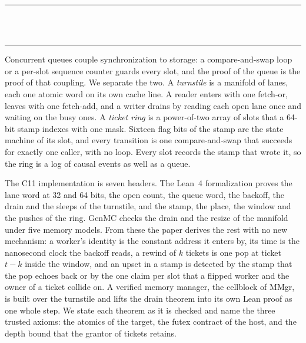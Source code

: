 \thispagestyle{empty}
\begin{center}
  \rule{\textwidth}{0.4pt}\\[0.9em]
  {\Large{}}\\[0.7em]
  \rule{\textwidth}{0.4pt}
\end{center}
\bigskip

\noindent Concurrent queues couple synchronization to storage: a compare-and-swap loop or a
per-slot sequence counter guards every slot, and the proof of the queue is the proof of that
coupling. We separate the two. A \emph{turnstile} is a manifold of lanes, each one atomic word on
its own cache line. A reader enters with one fetch-or, leaves with one fetch-add, and a writer
drains by reading each open lane once and waiting on the busy ones. A \emph{ticket ring} is a
power-of-two array of slots that a 64-bit stamp indexes with one mask. Sixteen flag bits of the
stamp are the state machine of its slot, and every transition is one compare-and-swap that
succeeds for exactly one caller, with no loop. Every slot records the stamp that wrote it, so the
ring is a log of causal events as well as a queue.

The C11 implementation is seven headers. The Lean~4 formalization proves the lane word at 32 and
64 bits, the open count, the queue word, the backoff, the drain and the sleeps of the turnstile, and
the stamp, the place, the window and the pushes of the ring. GenMC checks the drain and the resize
of the manifold under five memory models. From these the paper derives the rest with no new
mechanism: a worker's identity is the constant address it enters by, its time is the nanosecond
clock the backoff reads, a rewind of $k$ tickets is one pop at ticket $t - k$ inside the window, and
an upset in a stamp is detected by the stamp that the pop echoes back or by the one claim per slot
that a flipped worker and the owner of a ticket collide on. A verified memory manager,
the cellblock of MMgr, is built over the turnstile and lifts the drain theorem into its own Lean
proof as one whole step. We state each theorem as it is checked and name the three trusted axioms:
the atomics of the target, the futex contract of the host, and the depth bound that the grantor of
tickets retains.
\cleardoublepage
